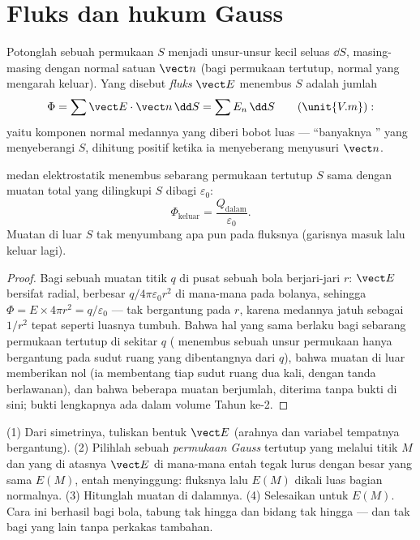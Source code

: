 \section{Fluks dan hukum Gauss}

\begin{definition}\label{def:b1:electrostatics-gauss:flux}
Potonglah sebuah permukaan $S$ menjadi unsur-unsur kecil seluas $\dd S$, masing-masing dengan
normal satuan $\vect n$ (bagi permukaan tertutup, normal yang mengarah keluar). Yang disebut
\emph{fluks} $\vect E$ menembus $S$ adalah jumlah
\[
\Phi = \sum \vect E\cdot\vect n\,\dd S = \sum E_n\,\dd S \qquad (\unit{V.m}):
\]
yaitu komponen normal medannya yang diberi bobot luas --- ``banyaknya '' yang menyeberangi $S$, dihitung positif ketika ia menyeberang menyusuri
$\vect n$.
\end{definition}

\begin{theorem}\label{thm:b1:electrostatics-gauss:gauss}
 medan elektrostatik menembus sebarang permukaan tertutup $S$
sama dengan muatan total yang dilingkupi $S$ dibagi $\varepsilon_0$:
\[
\Phi_{\text{keluar}} = \frac{Q_{\text{dalam}}}{\varepsilon_0} .
\]
Muatan di luar $S$ tak menyumbang apa pun pada fluksnya (garisnya masuk
lalu keluar lagi).
\end{theorem}

\begin{proof}
Bagi sebuah muatan titik $q$ di pusat sebuah bola berjari-jari $r$:
$\vect E$ bersifat radial, berbesar $q/4\pi\varepsilon_0r^2$ di mana-mana pada
bolanya, sehingga $\Phi = E \times 4\pi r^2 = q/\varepsilon_0$ --- tak bergantung pada $r$,
karena medannya jatuh sebagai $1/r^2$ tepat seperti luasnya tumbuh. Bahwa
hal yang sama berlaku bagi sebarang permukaan tertutup di sekitar $q$ ( menembus sebuah
unsur permukaan hanya bergantung pada sudut ruang yang dibentangnya dari $q$),
bahwa muatan di luar memberikan nol (ia membentang tiap sudut ruang dua kali,
dengan tanda berlawanan), dan bahwa  beberapa muatan berjumlah, diterima
tanpa bukti di sini; bukti lengkapnya ada dalam volume Tahun ke-2.
\end{proof}

\begin{method}\label{meth:b1:electrostatics-gauss:gauss}
(1) Dari simetrinya, tuliskan bentuk $\vect E$ (arahnya dan
variabel tempatnya bergantung). (2) Pilihlah sebuah \emph{permukaan Gauss} tertutup
yang melalui titik $M$ dan yang di atasnya $\vect E$ di mana-mana entah tegak lurus dengan
besar yang sama $E(M)$, entah menyinggung: fluksnya lalu $E(M)$ dikali
luas bagian normalnya. (3) Hitunglah muatan di dalamnya. (4) Selesaikan untuk
$E(M)$. Cara ini berhasil bagi bola, tabung tak hingga dan bidang tak hingga
--- dan tak bagi yang lain tanpa perkakas tambahan.
\end{method}

